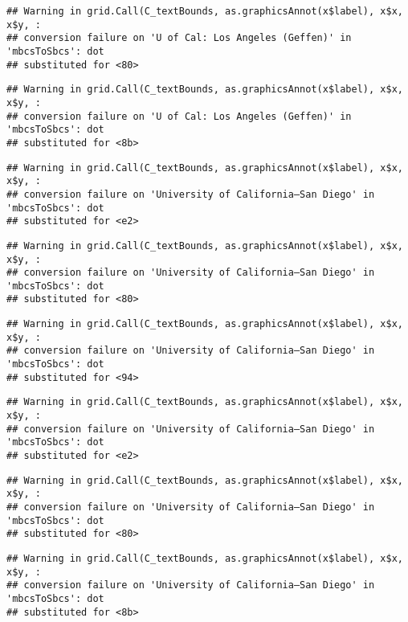 \documentclass[]{article}
\begin{document}
\begin{verbatim}
## Warning in grid.Call(C_textBounds, as.graphicsAnnot(x$label), x$x, x$y, :
## conversion failure on 'U of Cal: ​Los Angeles (Geffen)' in 'mbcsToSbcs': dot
## substituted for <80>
\end{verbatim}

\begin{verbatim}
## Warning in grid.Call(C_textBounds, as.graphicsAnnot(x$label), x$x, x$y, :
## conversion failure on 'U of Cal: ​Los Angeles (Geffen)' in 'mbcsToSbcs': dot
## substituted for <8b>
\end{verbatim}

\begin{verbatim}
## Warning in grid.Call(C_textBounds, as.graphicsAnnot(x$label), x$x, x$y, :
## conversion failure on 'University of California—​San Diego' in 'mbcsToSbcs': dot
## substituted for <e2>
\end{verbatim}

\begin{verbatim}
## Warning in grid.Call(C_textBounds, as.graphicsAnnot(x$label), x$x, x$y, :
## conversion failure on 'University of California—​San Diego' in 'mbcsToSbcs': dot
## substituted for <80>
\end{verbatim}

\begin{verbatim}
## Warning in grid.Call(C_textBounds, as.graphicsAnnot(x$label), x$x, x$y, :
## conversion failure on 'University of California—​San Diego' in 'mbcsToSbcs': dot
## substituted for <94>
\end{verbatim}

\begin{verbatim}
## Warning in grid.Call(C_textBounds, as.graphicsAnnot(x$label), x$x, x$y, :
## conversion failure on 'University of California—​San Diego' in 'mbcsToSbcs': dot
## substituted for <e2>
\end{verbatim}

\begin{verbatim}
## Warning in grid.Call(C_textBounds, as.graphicsAnnot(x$label), x$x, x$y, :
## conversion failure on 'University of California—​San Diego' in 'mbcsToSbcs': dot
## substituted for <80>
\end{verbatim}

\begin{verbatim}
## Warning in grid.Call(C_textBounds, as.graphicsAnnot(x$label), x$x, x$y, :
## conversion failure on 'University of California—​San Diego' in 'mbcsToSbcs': dot
## substituted for <8b>
\end{verbatim}
\end{document}
